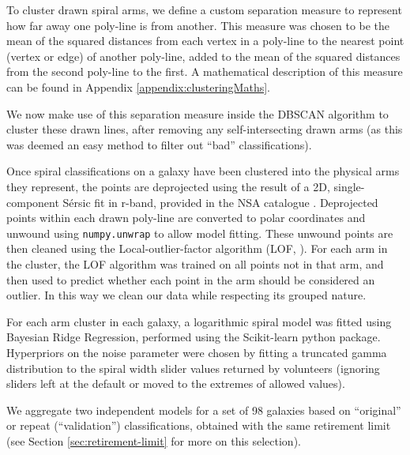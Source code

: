 \documentclass[../main.tex]{subfiles}
\begin{document}
To cluster drawn spiral arms, we define a custom separation measure to represent how far away one poly-line is from another. This measure was chosen to be the mean of the squared distances from each vertex in a poly-line to the nearest point (vertex or edge) of another poly-line, added to the mean of the squared distances from the second poly-line to the first. A mathematical description of this measure can be found in Appendix \ref{appendix:clusteringMaths}.

We now make use of this separation measure inside the DBSCAN algorithm to cluster these drawn lines, after removing any self-intersecting drawn arms (as this was deemed an easy method to filter out ``bad'' classifications).


Once spiral classifications on a galaxy have been clustered into the physical arms they represent, the points are deprojected using the result of a 2D, single-component S\'ersic fit in r-band, provided in the NSA catalogue \citep{2011AJ....142...31B}. Deprojected points within each drawn poly-line are converted to polar coordinates and unwound using \texttt{numpy.unwrap} to allow model fitting. These unwound points are then cleaned using the Local-outlier-factor algorithm (LOF, \citealt{local-outlier-factor}). For each arm in the cluster, the LOF algorithm was trained on all points not in that arm, and then used to predict whether each point in the arm should be considered an outlier. In this way we clean our data while respecting its grouped nature. 

For each arm cluster in each galaxy, a logarithmic spiral model was fitted using Bayesian Ridge Regression, performed using the Scikit-learn python package. Hyperpriors on the noise parameter were chosen by fitting a truncated gamma distribution to the spiral width slider values returned by volunteers (ignoring sliders left at the default or moved to the extremes of allowed values).


We aggregate two independent models for a set of 98 galaxies based on ``original'' or repeat (``validation'') classifications, obtained with the same retirement limit (see Section \ref{sec:retirement-limit} for more on this selection). 
\end{document}
